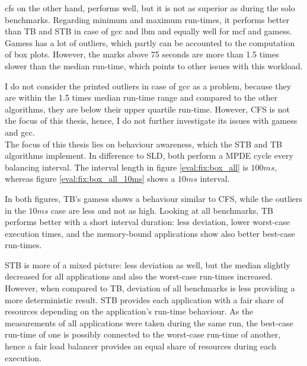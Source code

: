 \Gls{cfs} on the other hand, performs well, but it is not as superior as during
the solo benchmarks.
Regarding minimum and maximum run-times, it performs better than TB and STB in
case of gcc and lbm and equally well for mcf and gamess.
Gamess has a lot of outliers, which partly can be accounted to the computation
of box plots.
However, the marks above 75 seconds are more than 1.5 times slower than the
median run-time, which points to other issues with this workload.

I do not consider the printed outliers in case of gcc as a problem, because
they are within the 1.5 times median run-time range and compared to the other
algorithms, they are below their upper quartile run-time.
However, CFS is not the focus of this thesis, hence, I do not further
investigate its issues with gamess and gcc.
\\

The focus of this thesis lies on behaviour awareness, which the STB and TB
algorithms implement.
In difference to SLD, both perform a MPDE cycle every balancing interval.
The interval length in figure \ref{eval:fix:box_all} is $100ms$, whereas figure
\ref{eval:fix:box_all_10ms} shows a $10ms$ interval.

In both figures, TB's gamess shows a behaviour similar to CFS, while the
outliers in the $10ms$ case are less and not as high.
Looking at all benchmarks, TB performs better with a short interval duration:
less deviation, lower worst-case execution times, and the memory-bound
applications show also better best-case run-times.

STB is more of a mixed picture: less deviation as well, but the median
slightly decreased for all applications and also the worst-case run-times
increased.
However, when compared to TB, deviation of all benchmarks is less providing a
more deterministic result.
STB provides each application with a fair share of resources depending on the
application's run-time behaviour.
As the measurements of all applications were taken during the same run, the
best-case run-time of one is possibly connected to the worst-case run-time of
another, hence a fair load balancer provides an equal share of resources
during each execution.

